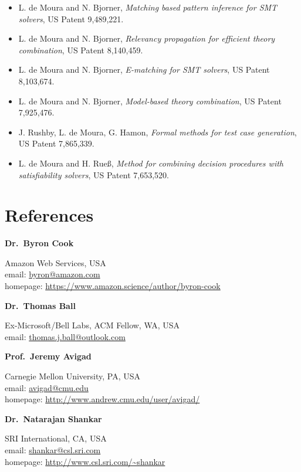 \documentclass[11pt,a4paper]{article}
\newcommand{\REF}[2]{%
  \noindent\textbf{#1}\par\nopagebreak
  #2\par\medskip
}
\begin{document}
\begin{itemize}[leftmargin=*,itemsep=0.4ex]
\item L. de Moura and N. Bjorner, \emph{Matching based pattern inference for SMT solvers}, US Patent 9,489,221.
\item L. de Moura and N. Bjorner, \emph{Relevancy propagation for efficient theory combination}, US Patent 8,140,459.
\item L. de Moura and N. Bjorner, \emph{E-matching for SMT solvers}, US Patent 8,103,674.
\item L. de Moura and N. Bjorner, \emph{Model-based theory combination}, US Patent 7,925,476.
\item J. Rushby, L. de Moura, G. Hamon, \emph{Formal methods for test case generation}, US Patent 7,865,339.
\item L. de Moura and H. Rue\ss, \emph{Method for combining decision procedures with satisfiability solvers}, US Patent 7,653,520.
\end{itemize}

\section*{References}

\REF{Dr.\ Byron Cook}
    {Amazon Web Services, USA \\
     email: \href{mailto:byron@amazon.com}{byron@amazon.com} \\
     homepage: \url{https://www.amazon.science/author/byron-cook}}

\REF{Dr.\ Thomas Ball}
    {Ex-Microsoft/Bell Labs, ACM Fellow, WA, USA \\
     email: \href{mailto:thomas.j.ball@outlook.com}{thomas.j.ball@outlook.com}}

\REF{Prof.\ Jeremy Avigad}
    {Carnegie Mellon University, PA, USA \\
     email: \href{mailto:avigad@cmu.edu}{avigad@cmu.edu} \\
     homepage: \url{http://www.andrew.cmu.edu/user/avigad/}}

\REF{Dr.\ Natarajan Shankar}
    {SRI International, CA, USA \\
     email: \href{mailto:shankar@csl.sri.com}{shankar@csl.sri.com} \\
     homepage: \url{http://www.csl.sri.com/~shankar}}
\end{document}
